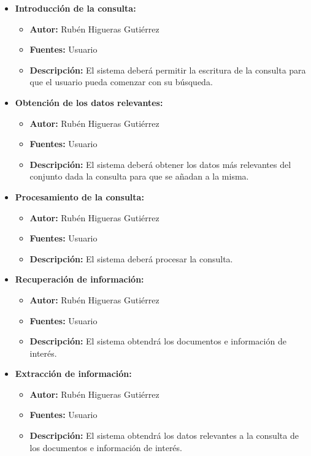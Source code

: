 \begin{itemize}
    \item \textbf{Introducción de la consulta:}
    \begin{itemize}
        \item \textbf{Autor:} Rubén Higueras Gutiérrez
        \item \textbf{Fuentes:} Usuario
        \item \textbf{Descripción:} El sistema deberá permitir la escritura de la consulta para que el usuario pueda comenzar con su búsqueda.
    \end{itemize}
    \item \textbf{Obtención de los datos relevantes:}
    \begin{itemize}
        \item \textbf{Autor:} Rubén Higueras Gutiérrez
        \item \textbf{Fuentes:} Usuario
        \item \textbf{Descripción:} El sistema deberá obtener los datos más relevantes del conjunto dada la consulta para que se añadan a la misma.
    \end{itemize}
    \item \textbf{Procesamiento de la consulta:}
    \begin{itemize}
        \item \textbf{Autor:} Rubén Higueras Gutiérrez
        \item \textbf{Fuentes:} Usuario
        \item \textbf{Descripción:} El sistema deberá procesar la consulta.
    \end{itemize}
    \item \textbf{Recuperación de información:}
    \begin{itemize}
        \item \textbf{Autor:} Rubén Higueras Gutiérrez
        \item \textbf{Fuentes:} Usuario
        \item \textbf{Descripción:} El sistema obtendrá los documentos e información de interés.
    \end{itemize}
    \item \textbf{Extracción de información:}
    \begin{itemize}
        \item \textbf{Autor:} Rubén Higueras Gutiérrez
        \item \textbf{Fuentes:} Usuario
        \item \textbf{Descripción:} El sistema obtendrá los datos relevantes a la consulta de los documentos e información de interés.

\end{itemize}
\end{itemize}
